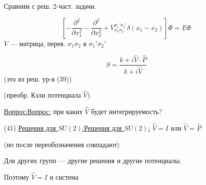 \documentclass[11pt]{article}
\theoremstyle{definition}
\theoremstyle{remark}
\let\DiplomaticMathUnderline\underline
\renewcommand{\underline}[1]{\ifmmode\DiplomaticMathUnderline{#1}\else\uline{#1}\fi}
\begin{document}
Сравним с реш. 2-част. задачи.

\begin{equation*}
\left[-\frac{\partial^2}{\partial x_1^2}
-\frac{\partial^2}{\partial x_2^2}
+V_{\sigma_1\sigma_2}^{\sigma_1'\sigma_2'}\delta(x_1-x_2)\right]\Phi=E\Phi
\tag{39}
\end{equation*}
$V$ — матрица, перев. $\sigma_1\sigma_2$ в $\sigma_1'\sigma_2'$

\begin{equation*}
S=\frac{k+i\hat V\cdot\hat P}{k+i\hat V}
\tag{40}
\end{equation*}
(это из реш. ур-я (39))

(преобр. Кэли потенциала $\hat V$).

\underline{Вопрос:} при каких $\hat V$ будет интегрируемость?

(41) \underline{Решения для $SU(2)$:} $\hat V=I$ или $\hat V=\hat P$

(но после переобозначения совпадают)

Для других групп — другие решения и другие потенциалы.

Поэтому $\hat V=I$ и система
\end{document}
